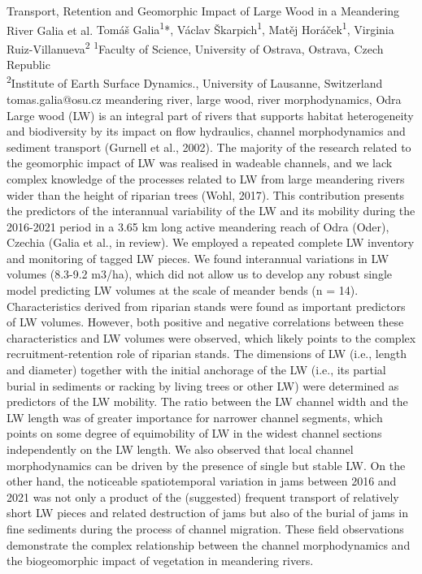 \abstract
{Transport, Retention and Geomorphic Impact of Large Wood in a Meandering River} %
{Galia et al.} %
{Tomáš Galia\textsuperscript{1}*, Václav Škarpich\textsuperscript{1}, Matěj Horáček\textsuperscript{1}, Virginia Ruiz-Villanueva\textsuperscript{2}} %
{\TLtag} %
{\textsuperscript{1}Faculty of Science, University of Ostrava, Ostrava, Czech Republic\\
\textsuperscript{2}Institute of Earth Surface Dynamics., University of Lausanne, Switzerland
} %
{tomas.galia@osu.cz}  %
{meandering river, large wood, river morphodynamics, Odra}%
{Large wood (LW) is an integral part of rivers that supports habitat heterogeneity and biodiversity by its impact on flow hydraulics, channel morphodynamics and sediment transport (Gurnell et al., 2002). The majority of the research related to the geomorphic impact of LW was realised in wadeable channels, and we lack complex knowledge of the processes related to LW from large meandering rivers wider than the height of riparian trees (Wohl, 2017). This contribution presents the predictors of the interannual variability of the LW and its mobility during the 2016-2021 period in a 3.65 km long active meandering reach of Odra (Oder), Czechia (Galia et al., in review). We employed a repeated complete LW inventory and monitoring of tagged LW pieces. We found interannual variations in LW volumes (8.3-9.2 m3/ha), which did not allow us to develop any robust single model predicting LW volumes at the scale of meander bends (n = 14). Characteristics derived from riparian stands were found as important predictors of LW volumes. However, both positive and negative correlations between these characteristics and LW volumes were observed, which likely points to the complex recruitment-retention role of riparian stands. The dimensions of LW (i.e., length and diameter) together with the initial anchorage of the LW (i.e., its partial burial in sediments or racking by living trees or other LW) were determined as predictors of the LW mobility. The ratio between the LW channel width and the LW length was of greater importance for narrower channel segments, which points on some degree of equimobility of LW in the widest channel sections independently on the LW length. We also observed that local channel morphodynamics can be driven by the presence of single but stable LW. On the other hand, the noticeable spatiotemporal variation in jams between 2016 and 2021 was not only a product of the (suggested) frequent transport of relatively short LW pieces and related destruction of jams but also of the burial of jams in fine sediments during the process of channel migration. These field observations demonstrate the complex relationship between the channel morphodynamics and the biogeomorphic impact of vegetation in meandering rivers.
}%
